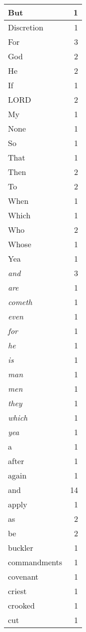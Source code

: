 \begin{center}
\begin{longtable}{l|r}
But & 1\\ \hline 
Discretion & 1\\ \hline 
For & 3\\ \hline 
God & 2\\ \hline 
He & 2\\ \hline 
If & 1\\ \hline 
LORD & 2\\ \hline 
My & 1\\ \hline 
None & 1\\ \hline 
So & 1\\ \hline 
That & 1\\ \hline 
Then & 2\\ \hline 
To & 2\\ \hline 
When & 1\\ \hline 
Which & 1\\ \hline 
Who & 2\\ \hline 
Whose & 1\\ \hline 
Yea & 1\\ \hline 
\emph{and} & 3\\ \hline 
\emph{are} & 1\\ \hline 
\emph{cometh} & 1\\ \hline 
\emph{even} & 1\\ \hline 
\emph{for} & 1\\ \hline 
\emph{he} & 1\\ \hline 
\emph{is} & 1\\ \hline 
\emph{man} & 1\\ \hline 
\emph{men} & 1\\ \hline 
\emph{they} & 1\\ \hline 
\emph{which} & 1\\ \hline 
\emph{yea} & 1\\ \hline 
a & 1\\ \hline 
after & 1\\ \hline 
again & 1\\ \hline 
and & 14\\ \hline 
apply & 1\\ \hline 
as & 2\\ \hline 
be & 2\\ \hline 
buckler & 1\\ \hline 
commandments & 1\\ \hline 
covenant & 1\\ \hline 
criest & 1\\ \hline 
crooked & 1\\ \hline 
cut & 1\\ \hline 

\end{longtable}
\end{center}
